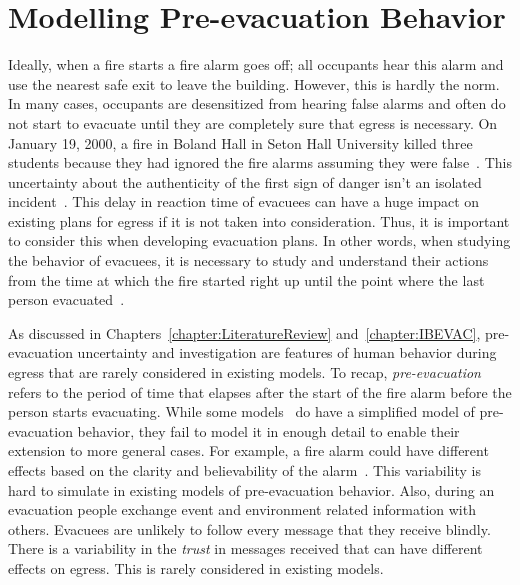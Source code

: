 
\chapter{Modelling Pre-evacuation Behavior}
\label{chapter:PreEvacuationBehavior}


Ideally, when a fire starts a fire alarm goes off; all occupants hear this alarm and use the nearest safe exit to leave the building. However, this is hardly the norm. In many cases, occupants are desensitized from hearing false alarms and often do not start to evacuate until they are completely sure that egress is necessary. On January 19, 2000, a fire in Boland Hall in Seton Hall University killed three students because they had ignored the fire alarms assuming they were false~\cite{Berry:2000us}. This uncertainty about the authenticity of the first sign of danger isn't an isolated incident~\cite{Graham:2000vl,Proulx:2001we,Proulx:1995wq,Proulx:2003tc,Purser:2001ts,Ramachandran:1990wj,Sime:1995uu,Tong:1985wn}. This delay in reaction time of evacuees can have a huge impact on existing plans for egress if it is not taken into consideration. Thus, it is important to consider this when developing evacuation plans. In other words, when studying the behavior of evacuees, it is necessary to study and understand their actions from the time at which the fire started right up until the point where the last person evacuated~\cite{Tong:1985wn}.



As discussed in Chapters~\ref{chapter:LiteratureReview} and~\ref{chapter:IBEVAC}, pre-evacuation uncertainty and investigation are features of human behavior during egress that are rarely considered in existing models. To recap, \emph{pre-evacuation} refers to the period of time that elapses after the start of the fire alarm before the person starts evacuating. While some models~\cite{Tsai:2011tz} do have a simplified model of pre-evacuation behavior, they fail to model it in enough detail to enable their extension to more general cases. For example, a fire alarm could have different effects based on the clarity and believability of the alarm~\cite{Kobes:2009jx,Paulsen:1984ti}. This variability is hard to simulate in existing models of pre-evacuation behavior. Also, during an evacuation people exchange event and environment related information with others. Evacuees are unlikely to follow every message that they receive blindly. There is a variability in the \emph{trust} in messages received that can have different effects on egress. This is rarely considered in existing models.


